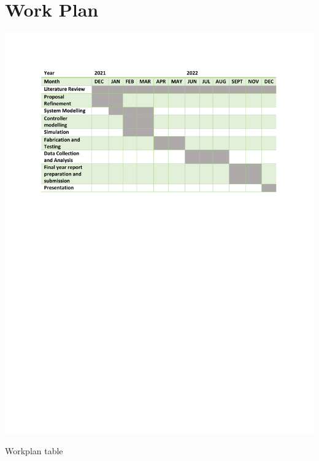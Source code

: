 \section{Work Plan}
\begin{table}[!h]
\includegraphics{Figures/workplan}
\caption{Workplan table}
\end{table}